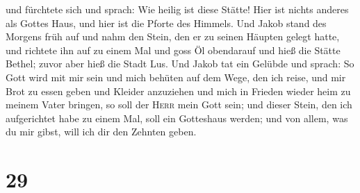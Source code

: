  und fürchtete sich und sprach: Wie heilig ist diese
Stätte! Hier ist nichts anderes als Gottes Haus, und hier ist die Pforte
des Himmels.  Und Jakob stand des Morgens früh auf und
nahm den Stein, den er zu seinen Häupten gelegt hatte, und richtete ihn
auf zu einem Mal und goss Öl obendarauf  und hieß die
Stätte Bethel; zuvor aber hieß die Stadt Lus.  Und Jakob
tat ein Gelübde und sprach: So Gott wird mit mir sein und mich behüten
auf dem Wege, den ich reise, und mir Brot zu essen geben und Kleider
anzuziehen  und mich in Frieden wieder heim zu meinem
Vater bringen, so soll der \textsc{Herr} mein Gott sein; 
und dieser Stein, den ich aufgerichtet habe zu einem Mal, soll ein
Gotteshaus werden; und von allem, was du mir gibst, will ich dir den
Zehnten geben.

\hypertarget{section-28}{%
\section{29}\label{section-28}}

